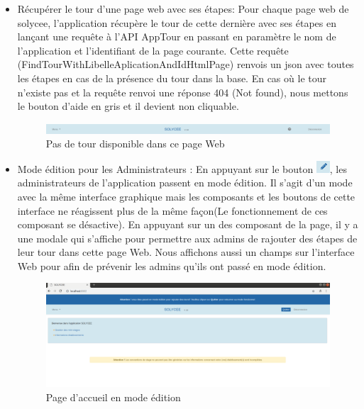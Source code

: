 \documentclass[12pt]{article}
\begin{document}
\begin{itemize}
\item Récupérer le tour d'une page web avec ses étapes: Pour chaque page web de solycee, l'application récupère le tour de cette dernière avec ses étapes en lançant une requête à l'API AppTour en passant en paramètre le nom de l'application et l'identifiant de la page courante. Cette requête (FindTourWithLibelleAplicationAndIdHtmlPage) renvois un json avec toutes les étapes en cas de la présence du tour dans la base. En cas où le tour n'existe pas et la requête renvoi une réponse 404 (Not found), nous mettons le bouton d'aide en gris et il devient non cliquable. 

\begin{figure}[H]
	\centering
 		\includegraphics[width=1\textwidth]{diagrammes/aideNonDispo.png} 
  		\caption{Pas de tour disponible dans ce page Web }
	\end{figure}
    

\item Mode édition pour les Administrateurs : En appuyant sur le bouton  \includegraphics[width=5mm,scale=0.5]{diagrammes/Bouton_modeEdition.png}, les administrateurs  de l'application passent en mode édition. Il s'agit d'un mode avec la même interface graphique mais les composants et les boutons de cette interface ne réagissent plus de la même façon(Le fonctionnement de ces composant se désactive). En appuyant sur un des composant de la page, il y a une modale qui s'affiche pour permettre aux admins de rajouter des étapes de leur tour dans cette page Web.  Nous affichons aussi un champs sur l'interface Web pour afin de prévenir les admins qu'ils ont passé en mode édition.

 \begin{figure}[H]
	\centering
 		\includegraphics[width=1\textwidth]{diagrammes/mode_edition.png} 
  		\caption{Page d'accueil en mode édition}
	\end{figure}


\end{itemize}
\end{document}
